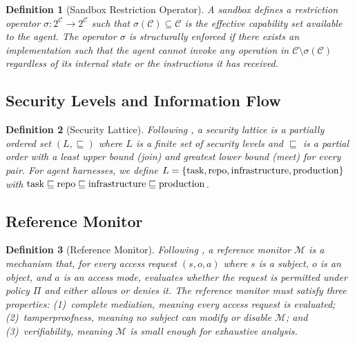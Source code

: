 \documentclass[11pt, a4paper, copyright]{googledeepmind}
\newtheorem{definition}{Definition}[section]
\begin{document}
\begin{definition}[Sandbox Restriction Operator]
\label{def:sandbox}
A \emph{sandbox} defines a restriction operator $\sigma: 2^{\mathcal{C}} \to 2^{\mathcal{C}}$ such that $\sigma(\mathcal{C}) \subseteq \mathcal{C}$ is the effective capability set available to the agent. The operator $\sigma$ is \emph{structurally enforced} if there exists an implementation such that the agent cannot invoke any operation in $\mathcal{C} \setminus \sigma(\mathcal{C})$ regardless of its internal state or the instructions it has received.
\end{definition}

\subsection{Security Levels and Information Flow}

\begin{definition}[Security Lattice]
\label{def:lattice}
Following \citet{denning1976lattice}, a \emph{security lattice} is a partially ordered set $(L, \sqsubseteq)$ where $L$ is a finite set of security levels and $\sqsubseteq$ is a partial order with a least upper bound (join) and greatest lower bound (meet) for every pair. For agent harnesses, we define $L = \{\textup{task}, \textup{repo}, \textup{infrastructure}, \textup{production}\}$ with $\textup{task} \sqsubseteq \textup{repo} \sqsubseteq \textup{infrastructure} \sqsubseteq \textup{production}$.
\end{definition}

\subsection{Reference Monitor}

\begin{definition}[Reference Monitor]
\label{def:refmon}
Following \citet{anderson1972reference}, a \emph{reference monitor} $\mathcal{M}$ is a mechanism that, for every access request $(s, o, a)$ where $s$ is a subject, $o$ is an object, and $a$ is an access mode, evaluates whether the request is permitted under policy $\Pi$ and either allows or denies it. The reference monitor must satisfy three properties: (1)~\emph{complete mediation}, meaning every access request is evaluated; (2)~\emph{tamperproofness}, meaning no subject can modify or disable $\mathcal{M}$; and (3)~\emph{verifiability}, meaning $\mathcal{M}$ is small enough for exhaustive analysis.
\end{definition}
\end{document}
